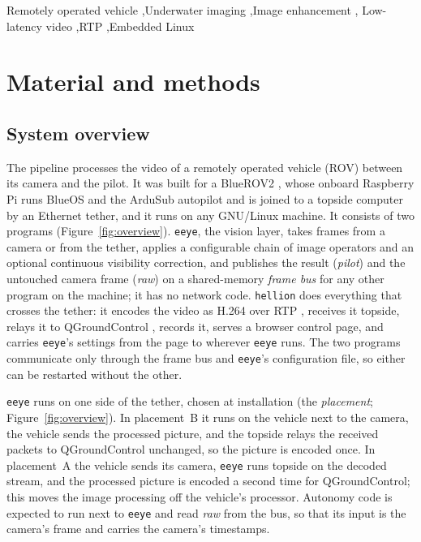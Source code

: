 \documentclass[a4paper,fleqn]{cas-sc}
\newcommand{\eeye}{\texttt{eeye}}
\newcommand{\hellion}{\texttt{hellion}}
\begin{document}
\begin{keywords}
  Remotely operated vehicle \sep Underwater imaging \sep Image enhancement \sep
  Low-latency video \sep RTP \sep Embedded Linux
\end{keywords}

\maketitle

\doublespacing

\section{Material and methods}\label{sec:methods}

\subsection{System overview}\label{sec:overview}

The pipeline processes the video of a remotely operated vehicle (ROV) between its
camera and the pilot. It was built for a BlueROV2 \citep{bluerov2}, whose onboard
Raspberry Pi runs BlueOS and the ArduSub autopilot \citep{ardusub} and is joined to a
topside computer by an Ethernet tether, and it runs on any GNU/Linux machine. It
consists of two programs (Figure~\ref{fig:overview}). \eeye{}, the vision layer, takes
frames from a camera or from the tether, applies a configurable chain of image
operators and an optional continuous visibility correction, and publishes the result
(\emph{pilot}) and the untouched camera frame (\emph{raw}) on a shared-memory
\emph{frame bus} for any other program on the machine; it has no network code.
\hellion{} does everything that crosses the tether: it encodes the video as H.264
\citep{itu_h264} over RTP \citep{rfc3550,rfc6184}, receives it topside, relays it to
QGroundControl \citep{qgroundcontrol}, records it, serves a browser control page, and
carries \eeye{}'s settings from the page to wherever \eeye{} runs. The two programs
communicate only through the frame bus and \eeye{}'s configuration file, so either can
be restarted without the other.

\eeye{} runs on one side of the tether, chosen at installation (the \emph{placement};
Figure~\ref{fig:overview}). In placement~B it runs on the vehicle next to the camera,
the vehicle sends the processed picture, and the topside relays the received packets to
QGroundControl unchanged, so the picture is encoded once. In placement~A the vehicle
sends its camera, \eeye{} runs topside on the decoded stream, and the processed picture
is encoded a second time for QGroundControl; this moves the image processing off the
vehicle's processor. Autonomy code is expected to run next to \eeye{} and read
\emph{raw} from the bus, so that its input is the camera's frame and carries the
camera's timestamps.
\end{document}

